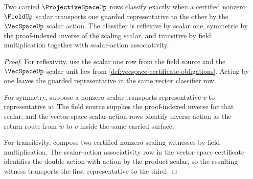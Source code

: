 \begin{theorem}
\label{thm:projectivespace-scaling-orbit-classifier-obligation}
Two carried $\ProjectiveSpaceUp$ rows classify exactly when a certified
nonzero $\FieldUp$ scalar transports one guarded representative to the other
by the $\VecSpaceUp$ scalar action. The classifier is reflexive by scalar
one, symmetric by the proof-indexed inverse of the scaling scalar, and
transitive by field multiplication together with scalar-action associativity.
\end{theorem}
\begin{proof}
For reflexivity, use the scalar one row from the field source and the
$\VecSpaceUp$ scalar unit law from
\autoref{def:vecspace-certificate-obligations}. Acting by one leaves the
guarded representative in the same vector classifier row.

For symmetry, suppose a nonzero scalar transports representative $v$ to
representative $w$. The field source supplies the proof-indexed inverse for
that scalar, and the vector-space scalar-action rows identify inverse action
as the return route from $w$ to $v$ inside the same carried surface.

For transitivity, compose two certified nonzero scaling witnesses by field
multiplication. The scalar-action associativity row in the vector-space
certificate identifies the double action with action by the product scalar,
so the resulting witness transports the first representative to the third.
\end{proof}

